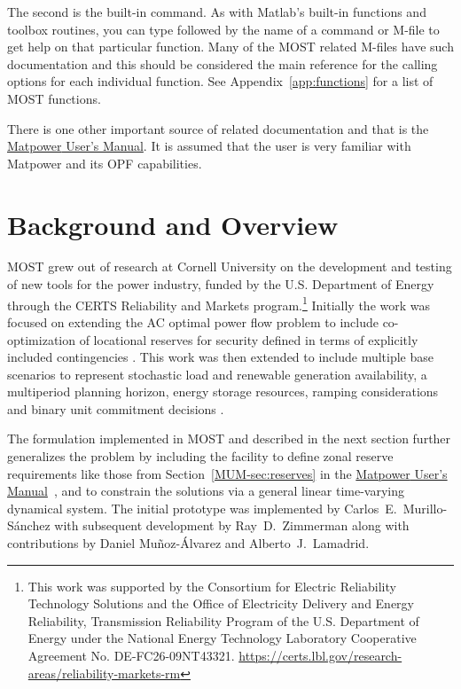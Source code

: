\documentclass[12pt]{article}
\newcommand{\mpver}[0]{6.0}
\newcommand{\matlab}[0]{{\sc Matlab}}
\newcommand{\matpower}[0]{{\sc Matpower}}
\newcommand{\most}[0]{{MOST}}
\newcommand{\code}[1]{{\relsize{-0.5}{\tt{{#1}}}}}  %
\newcommand{\mumurl}[0]{http://www.pserc.cornell.edu/matpower/docs/MATPOWER-manual-\mpver.pdf}
\newcommand{\mum}[0]{\href{\mumurl}{\matpower{} User's Manual}}
\numberwithin{equation}{section}
\numberwithin{table}{section}
\numberwithin{figure}{section}
\begin{document}
The second is the built-in \code{help} command. As with \matlab{}'s built-in functions and toolbox routines, you can type \code{help} followed by the name of a command or M-file to get help on that particular function. Many of the \most{} related M-files have such documentation and this should be considered the main reference for the calling options for each individual function. See Appendix~\ref{app:functions} for a list of \most{} functions.

There is one other important source of related documentation and that is the \mum{}. It is assumed that the user is very familiar with \matpower{} and its OPF capabilities.


\clearpage
\section{Background and Overview}

\most{} grew out of research at Cornell University on the development and testing of new tools for the power industry, funded by the U.S. Department of Energy through the CERTS Reliability and Markets program.\footnote{This work was supported by the Consortium for Electric Reliability Technology Solutions and the Office of Electricity Delivery and Energy Reliability, Transmission Reliability Program of the U.S. Department of Energy under the National Energy Technology Laboratory Cooperative Agreement No. DE-FC26-09NT43321. \url{https://certs.lbl.gov/research-areas/reliability-markets-rm}} Initially the work was focused on extending the AC optimal power flow problem to include co-optimization of locational reserves for security defined in terms of explicitly included contingencies \cite{superopf2008,murillo-sanchez2013}. This work was then extended to include multiple base scenarios to represent stochastic load and renewable generation availability, a multiperiod planning horizon, energy storage resources, ramping considerations and binary unit commitment decisions \cite{murillo-sanchez2013a}.

The formulation implemented in \most{} and described in the next section further generalizes the problem by including the facility to define zonal reserve requirements like those from Section~\ref{MUM-sec:reserves} in the \mum{}~\cite{matpower}, and to constrain the solutions via a general linear time-varying dynamical system. The initial prototype was implemented by Carlos~E.~Murillo-S\'anchez with subsequent development by Ray~D.~Zimmerman along with contributions by Daniel Mu\~noz-\'Alvarez and Alberto~J.~Lamadrid.
\end{document}
